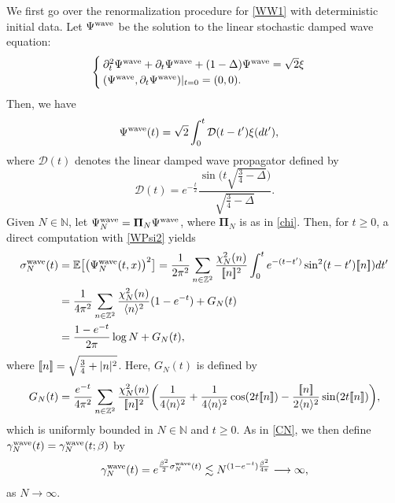 \documentclass[letterpaper, 11pt,  reqno]{amsart}
\theoremstyle{myremark}
\newcommand{\1}{\hspace{0.5mm}\text{I}\hspace{0.5mm}}
\newcommand{\Z}{\mathbb{Z}}
\newcommand{\D}{\mathcal{D}}
\newcommand{\Pii}{\mathbf{\Pi}}
\newcommand{\E}{\mathbb{E}}
\newcommand{\be}{\beta}
\newcommand{\Dl}{\Delta}
\newcommand{\g}{\gamma}
\newcommand{\s}{\sigma}
\newcommand{\dt}{\partial_t}
\newcommand{\les}{\lesssim}
\newcommand{\jb}[1]
{\langle #1 \rangle}
\newcommand{\jbb}[1]
{[\hspace{-0.6mm}[ #1 ]\hspace{-0.6mm}]}
\newcommand{\too}{\longrightarrow}
\newcommand{\N}{\mathbb{N}}
\newcommand{\wave}{\textup{wave}}
\numberwithin{equation}{section}
\numberwithin{theorem}{section}
\begin{document}
We first go over the renormalization procedure for \eqref{WW1}
with deterministic initial data.
Let $\Psi^\wave$  be the solution to the linear stochastic damped wave equation:
\begin{align*}
\begin{cases}
\dt^2 \Psi^\wave + \dt\Psi^\wave +(1-\Dl)\Psi^\wave  = \sqrt{2}\xi\\
(\Psi^\wave,\dt\Psi^\wave)|_{t=0}=(0,0).
\end{cases}
\end{align*}
Then, we have 
\begin{align} 
\Psi^\wave (t) 
&  = 
 \sqrt{2}\int_0^t\D(t - t')\xi(dt'), 
\label{WPsi2}
\end{align}
where 
$\D(t)$ denotes 
 the linear damped wave propagator defined by 
\begin{equation*}
\D(t) = e^{-\frac{t}2}\frac{\sin\Big(t\sqrt{\frac34-\Dl}\Big)}{\sqrt{\frac34-\Dl}}.
\end{equation*} 
Given $N \in \N$, let $\Psi_N^\wave = \Pii_N \Psi^\wave$, 
where $\Pii_N$ is as in \eqref{chi}.
Then, 
for $t \ge 0$, 
a direct computation with \eqref{WPsi2} 
 yields
\begin{align*}
\s_N^\wave(t)
& = \E\big[\big(\Psi_N^\wave(t, x)\big)^2\big]
 = \frac 1{2\pi^2} \sum_{n \in \Z^2}
\frac{\chi_N^2(n)}{\jbb{n}^2} \int_0^t e^{-(t- t')} \sin^2(t-t')\jbb{n}) dt'\\
& = \frac 1{4\pi^2} \sum_{n \in \Z^2}
\frac{\chi_N^2(n)}{\jb{n}^2}(1- e^{-t})
+ G_N (t) \\
&   = \frac {1- e^{-t}}{2\pi}\log N 
+ G_N(t),  
\end{align*}
where $\jbb{n} = \sqrt{\frac 34 + |n|^2}$.
Here, $G_N(t)$ is defined by 
\begin{align*}
G_N(t) = 
\frac {e^{-t} }{4\pi^2} \sum_{n \in \Z^2}
\frac{\chi_N^2(n)}
{\jbb{n}^2}
\bigg(\frac{1}{4\jb{n}^2}
+ \frac{1}{4\jb{n}^2} \cos(2t \jbb{n})
- \frac{\jbb{n}}{2\jb{n}^2} \sin(2t \jbb{n})\bigg), 
\end{align*}
which is uniformly bounded in $N \in \N$ and $t \ge 0$.
As in \eqref{CN}, we then define $\g_N^\wave(t) = \g_N^\wave(t; \be)$
by 
 \begin{equation}
\g_N^\wave (t) = e^{\frac{\be^2}{2}\s_N^\wave(t)}
\les  
N^{(1- e^{-t})\frac{\be^2}{4\pi}} \too \infty,  
\label{WCN}
 \end{equation}
as $N \to \infty$.
\end{document}
